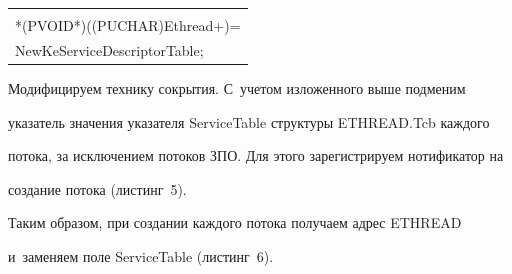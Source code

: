\begin{table}[b]
\begin{center}
\tabcolsep=26pt


\begin{tabular}{|l|}


  \hline 


  \\[-9pt]


*({\sf PVOID}*)(({\sf PUCHAR}){\sf Ethread}\;+\;{\sf ServieTableOffset})\;=\;\\


{\sf NewKeServiceDescriptorTable};\\


\hline


\end{tabular}





\vspace*{-3pt}





  \parbox{286pt}{


}


\end{center}


\end{table}





  Модифицируем технику сокрытия. С~учетом изложенного выше подменим 


указатель значения указателя {\sf ServiceTable} структуры {\sf ETHREAD.Tcb} каждого 


потока, за исключением потоков ЗПО. Для этого зарегистрируем нотификатор на 


создание потока (листинг~5).





  


  Таким образом, при создании каждого потока получаем адрес {\sf ETHREAD} 


и~заменяем поле {\sf ServiceTable} (листинг~6).





